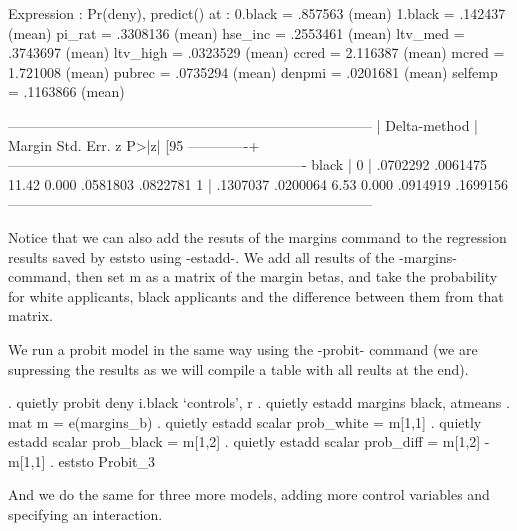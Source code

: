 \documentclass{scrartcl}
\begin{document}
\begin{SoutputC}
Expression   : Pr(deny), predict()
at           : 0.black         =     .857563 (mean)
               1.black         =     .142437 (mean)
               pi_rat          =    .3308136 (mean)
               hse_inc         =    .2553461 (mean)
               ltv_med         =    .3743697 (mean)
               ltv_high        =    .0323529 (mean)
               ccred           =    2.116387 (mean)
               mcred           =    1.721008 (mean)
               pubrec          =    .0735294 (mean)
               denpmi          =    .0201681 (mean)
               selfemp         =    .1163866 (mean)

------------------------------------------------------------------------------
             |            Delta-method
             |     Margin   Std. Err.      z    P>|z|     [95%
-------------+----------------------------------------------------------------
       black |
          0  |   .0702292   .0061475    11.42   0.000     .0581803    .0822781
          1  |   .1307037   .0200064     6.53   0.000     .0914919    .1699156
------------------------------------------------------------------------------
\end{SoutputC}

Notice that we can also add the resuts of the margins command to the regression results saved by eststo using -estadd-. We add all results of the -margins- command, then set m as a matrix of the margin betas, and take the probability for white applicants, black applicants and the difference between them from that matrix.

We run a probit model in the same way using the -probit- command (we are supressing the results as we will compile a table with all reults at the end).

\begin{SinputC}
. quietly probit deny i.black `controls', r
. quietly estadd margins black, atmeans
. mat m = e(margins_b)
. quietly estadd scalar prob_white = m[1,1]
. quietly estadd scalar prob_black = m[1,2]
. quietly estadd scalar prob_diff = m[1,2] - m[1,1]
. eststo Probit_3
\end{SinputC}

And we do the same for three more models, adding more control variables and specifying an interaction.
\end{document}
